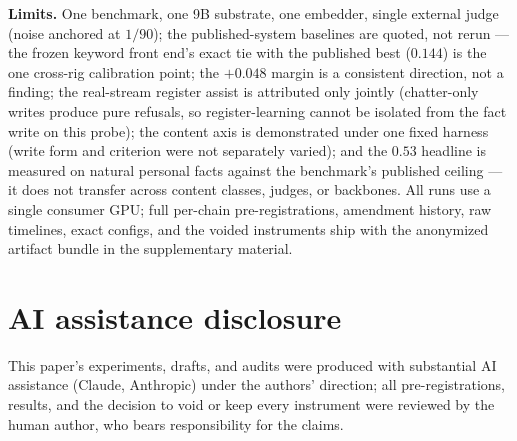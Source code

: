 \documentclass{article}
\begin{document}
\textbf{Limits.} One benchmark, one 9B substrate, one embedder, single external judge
(noise anchored at $1/90$); the published-system baselines are quoted, not rerun --- the
frozen keyword front end's exact tie with the published best ($0.144$) is the one
cross-rig calibration point; the $+0.048$ margin is a consistent direction, not a finding;
the real-stream register assist is attributed only jointly (chatter-only writes produce
pure refusals, so register-learning cannot be isolated from the fact write on this
probe); the content axis is demonstrated under one fixed harness (write form and
criterion were not separately varied); and the $0.53$ headline is measured on natural
personal facts against the benchmark's published ceiling --- it does not transfer across
content classes, judges, or backbones. All runs use a single consumer GPU; full per-chain
pre-registrations, amendment history, raw timelines, exact configs, and the voided
instruments ship with the anonymized artifact bundle in the supplementary material.

\section*{AI assistance disclosure}
This paper's experiments, drafts, and audits were produced with substantial AI assistance
(Claude, Anthropic) under the authors' direction; all pre-registrations, results, and the
decision to void or keep every instrument were reviewed by the human author, who bears
responsibility for the claims.



\end{document}
